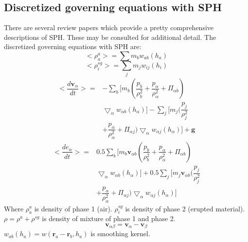 \documentclass[conference,compsoc]{IEEEtran}
\begin{document}
\subsection{Discretized governing equations with SPH}
There are several review papers \cite{monaghan1992smoothed, monaghan2005smoothed, price2012smoothed, monaghan2012smoothed} which provide a pretty comprehensive descriptions of SPH. These may be consulted for additional detail.%
The discretized governing equations with SPH are:
\begin{equation}
<\rho_a^a>=\sum m_b w_{ab} (h_a) \label{eq:gov-sph-d1}
\end{equation}
\begin{equation}
<\rho_i^{sg}>=\sum_j m_j w_{ij} (h_i) \label{eq:gov-sph-d2}
\end{equation}
\begin{equation}
\begin{split}
<\dfrac{d \textbf{v}_{\alpha}}{d t}>= &
-\sum_b [m_b (\dfrac{p_b}{\rho_b^2} + \dfrac{p_{\alpha}}{\rho_{\alpha}^2} + \Pi_{\alpha b}) \\ &\bigtriangledown_{\alpha}w_{\alpha b}(h_{\alpha})]
-\sum_j [m_j (\dfrac{p_j}{\rho_j^2} \\ & + \dfrac{p_{\alpha}}{\rho_{\alpha}^2} + \Pi_{\alpha j}) \bigtriangledown_{\alpha}w_{\alpha j}(h_{\alpha})]
+\textbf{g}
\end{split} 
\label{eq:gov-sph-v}
\end{equation}
\begin{equation}
\begin{split}
<\dfrac{d e_{\alpha}}{d t}>=&
 0.5\sum_b [m_b \textbf{v}_{\alpha b}(\dfrac{p_b}{\rho_b^2} + \dfrac{p_{\alpha}}{\rho_{\alpha}^2} + \Pi_{\alpha b})\\ & \bigtriangledown_{\alpha}w_{\alpha b}(h_{\alpha})]
+0.5\sum_j [m_j \textbf{v}_{\alpha b}(\dfrac{p_j}{\rho_j^2} \\ & + \dfrac{p_{\alpha}}{\rho_{\alpha}^2} + \Pi_{\alpha j}) \bigtriangledown_{\alpha}w_{\alpha j}(h_{\alpha})]
\end{split} 
\label{eq:gov-sph-e}
\end{equation}
Where
$\rho_a^a$ is density of phase 1 (air).
$\rho_i^{sg}$ is density of phase 2 (erupted material).
$\rho=\rho^a + \rho^{sg}$ is density of mixture of phase 1 and phase 2.
\begin{equation}
\textbf{v}_{\alpha \beta}=\textbf{v}_{\alpha}-\textbf{v}_{\beta}
\end{equation}
$w_{ab} (h_a)= w(\textbf{r}_a-\textbf{r}_b,h_a)$ is smoothing kernel.
\end{document}
